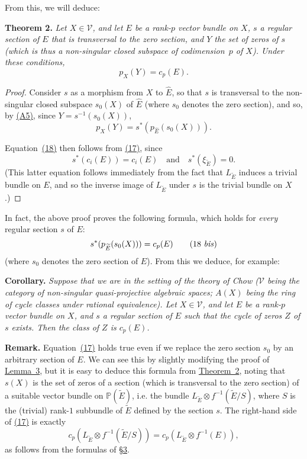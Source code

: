 \documentclass{article}
\newenvironment{itenv}[1]
  {\phantomsection\par\medskip\noindent\textbf{#1.}\itshape}
  {\medskip}
\newenvironment{rmenv}[1]
  {\phantomsection\par\medskip\noindent\textbf{#1.}\rmfamily}
  {\medskip}
\renewcommand{\cal}[1]{{\mathcal{#1}}}
\newcommand{\oldpage}[1]{\marginpar{\footnotesize$\Big\vert$ \textit{p.~#1}}}
\begin{document}
From this, we will deduce:

\begin{itenv}{Theorem 2}
\label{theorem2}
  Let $X\in\cal{V}$, and let $E$ be a rank-$p$ vector bundle on $X$, $s$ a regular section of $E$ that is transversal to the zero section, and $Y$ the set of zeros of $s$ (which is thus a non-singular closed subspace of codimension~$p$ of $X$).
  Under these conditions,
  \[
  \label{equation18}
    p_X(Y) = c_p(E).
  \tag{18}
  \] 
\end{itenv}

\begin{proof}
  Consider $s$ as a morphism from $X$ to $\widehat{E}$, so that $s$ is transversal to the non-singular closed subspace $s_0(X)$ of $\widehat{E}$ (where $s_0$ denotes the zero section), and so, by \hyperref[axiomA5]{(A5)}, since $Y=s^{-1}(s_0(X))$,
  \[
    p_X(Y) = s^*(p_{\widehat{E}}(s_0(X))).
  \]

  Equation~\hyperref[equation18]{(18)} then follows from \hyperref[equation17]{(17)}, since
  \[
    s^*(c_i(E)) = c_i(E)
    \quad\text{and}\quad
    s^*(\xi_{\widetilde{E}}) = 0.
  \]
  (This latter equation follows immediately from the fact that $L_{\widetilde{E}}$ induces a trivial bundle on $E$, and so the inverse image of $L_{\widetilde{E}}$ under $s$ is the trivial bundle on $X$.)
\end{proof}

In fact, the above proof proves the following formula, which holds for \emph{every} regular section $s$ of $E$:
\[
\label{equation18bis}
  s^*(p_{\widetilde{E}}(s_0(X))) = c_p(E)
\tag{18 \emph{bis}}
\]
(where $s_0$ denotes the zero section of $E$).
From this we deduce, for example:

\begin{itenv}{Corollary}
  Suppose that we are in the setting of the theory of Chow ($\cal{V}$ being the category of non-singular quasi-projective algebraic spaces; $A(X)$ being the ring of cycle classes under rational equivalence).
  Let $X\in\cal{V}$, and let $E$ be a rank-$p$ vector bundle on $X$, and $s$ a regular section of $E$ such that the cycle of zeros $Z$ of $s$ exists.
  Then the class of $Z$ is $c_p(E)$.
\end{itenv}

\begin{rmenv}{Remark}
  Equation~\hyperref[equation17]{(17)} holds true even if we replace the zero section $s_0$ by an arbitrary section of $E$.
  We can see this by slightly modifying the proof of \hyperref[lemma3]{Lemma~3}, but it is easy to deduce this formula from
\oldpage{154}
  \hyperref[theorem2]{Theorem~2}, noting that $s(X)$ is the set of zeros of a section (which is transversal to the zero section) of a suitable vector bundle on $\mathbb{P}(\widetilde{E})$, i.e. the bundle $L_{\widetilde{E}}\otimes f^{-1}(\widetilde{E}/S)$, where $S$ is the (trivial) rank-$1$ subbundle of $\widetilde{E}$ defined by the section $s$.
  The right-hand side of \hyperref[equation17]{(17)} is exactly
  \[
    c_p(L_{\widetilde{E}}\otimes f^{-1}(\widetilde{E}/S)) = c_p(L_{\widetilde{E}}\otimes f^{-1}(E)),
  \]
  as follows from the formulas of \hyperref[section3]{\S3}.
\end{rmenv}
\end{document}
